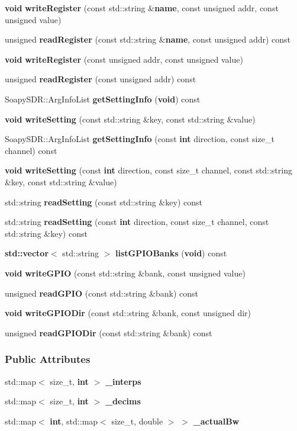 \begin{DoxyCompactItemize}
\item 
{\bf void} {\bf write\+Register} (const std\+::string \&{\bf name}, const unsigned addr, const unsigned value)
\item 
unsigned {\bf read\+Register} (const std\+::string \&{\bf name}, const unsigned addr) const 
\item 
{\bf void} {\bf write\+Register} (const unsigned addr, const unsigned value)
\item 
unsigned {\bf read\+Register} (const unsigned addr) const 
\item 
Soapy\+S\+D\+R\+::\+Arg\+Info\+List {\bf get\+Setting\+Info} ({\bf void}) const 
\item 
{\bf void} {\bf write\+Setting} (const std\+::string \&key, const std\+::string \&value)
\item 
Soapy\+S\+D\+R\+::\+Arg\+Info\+List {\bf get\+Setting\+Info} (const {\bf int} direction, const size\+\_\+t channel) const 
\item 
{\bf void} {\bf write\+Setting} (const {\bf int} direction, const size\+\_\+t channel, const std\+::string \&key, const std\+::string \&value)
\item 
std\+::string {\bf read\+Setting} (const std\+::string \&key) const 
\item 
std\+::string {\bf read\+Setting} (const {\bf int} direction, const size\+\_\+t channel, const std\+::string \&key) const 
\item 
{\bf std\+::vector}$<$ std\+::string $>$ {\bf list\+G\+P\+I\+O\+Banks} ({\bf void}) const 
\item 
{\bf void} {\bf write\+G\+P\+IO} (const std\+::string \&bank, const unsigned value)
\item 
unsigned {\bf read\+G\+P\+IO} (const std\+::string \&bank) const 
\item 
{\bf void} {\bf write\+G\+P\+I\+O\+Dir} (const std\+::string \&bank, const unsigned dir)
\item 
unsigned {\bf read\+G\+P\+I\+O\+Dir} (const std\+::string \&bank) const 
\end{DoxyCompactItemize}
\subsubsection*{Public Attributes}
\begin{DoxyCompactItemize}
\item 
std\+::map$<$ size\+\_\+t, {\bf int} $>$ {\bf \+\_\+interps}
\item 
std\+::map$<$ size\+\_\+t, {\bf int} $>$ {\bf \+\_\+decims}
\item 
std\+::map$<$ {\bf int}, std\+::map$<$ size\+\_\+t, double $>$ $>$ {\bf \+\_\+actual\+Bw}
\end{DoxyCompactItemize}
